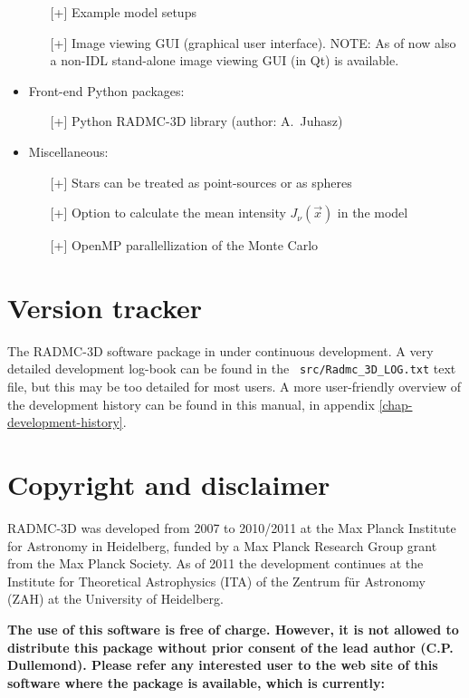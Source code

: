 \documentclass{report}
\begin{document}
\begin{itemize}
  \begin{itemize}
    \item[][+] Example model setups
    \item[][+] Image viewing GUI (graphical user interface). NOTE: As of now
      also a non-IDL stand-alone image viewing GUI (in Qt) is available.
  \end{itemize}
\item Front-end Python packages:
  \begin{itemize}
    \item[][+] Python RADMC-3D library (author: A.~Juhasz)
  \end{itemize}
\item Miscellaneous:
  \begin{itemize}
    \item[][+] Stars can be treated as point-sources or as spheres
    \item[][+] Option to calculate the mean intensity $J_\nu(\vec x)$ in the model
    \item[][+] OpenMP parallellization of the Monte Carlo
  \end{itemize}
\end{itemize}


\section{Version tracker}
The RADMC-3D software package in under continuous development. A very
detailed development log-book can be found in the {\small\tt
  src/Radmc\_3D\_LOG.txt} text file, but this may be too detailed for most
users. A more user-friendly overview of the development history can be 
found in this manual, in appendix \ref{chap-development-history}.


\section{Copyright and disclaimer} 
RADMC-3D was developed from 2007 to 2010/2011 at the Max Planck Institute
for Astronomy in Heidelberg, funded by a Max Planck Research Group grant
from the Max Planck Society. As of 2011 the development continues at the
Institute for Theoretical Astrophysics (ITA) of the Zentrum f\"ur Astronomy
(ZAH) at the University of Heidelberg.

{\bf The use of this software is free of charge. However, it is not allowed
  to distribute this package without prior consent of the lead author
  (C.P. Dullemond). Please refer any interested user to the web site of this
  software where the package is available, which is currently:}
\end{document}
